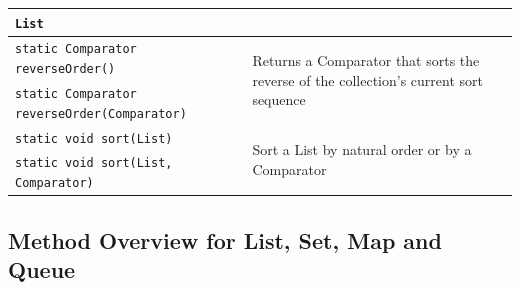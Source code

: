 \begin{center}
\begin{tabular}{lp{}}
    \verb#List# \\
    \hline
    \verb#static Comparator reverseOrder()# & 
    \multirow{2}{0.4\textwidth}{Returns a Comparator that sorts the reverse of 
    the collection's current sort sequence} \\
    \verb#static Comparator reverseOrder(Comparator)# & \\
    \hline
    \verb#static void sort(List)# & \multirow{2}{0.4\textwidth}{Sort a List by 
    natural order or by a Comparator} \\
    \verb#static void sort(List, Comparator)# & \\
\end{tabular}
\end{center}

\subsection{Method Overview for List, Set, Map and Queue}

